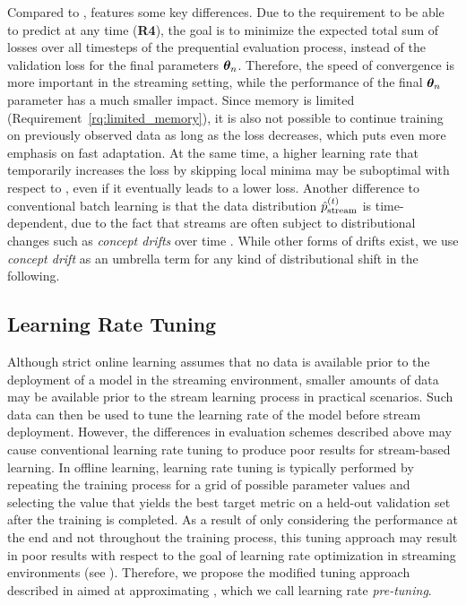 \documentclass{article} %
\begin{document}
Compared to ,  features some key differences.
Due to the requirement to be able to predict at any time (\textbf{R4}), the goal is to minimize the expected total sum of losses over all timesteps of the prequential evaluation process, instead of the validation loss for the final parameters ${\bm{\theta}}_n$.
Therefore, the speed of convergence is more important in the streaming setting, while the performance of the final ${\bm{\theta}}_n$ parameter has a much smaller impact.
Since memory is limited (Requirement~\ref{rq:limited_memory}), it is also not possible to continue training on previously observed data as long as the loss decreases, which puts even more emphasis on fast adaptation.
At the same time, a higher learning rate that temporarily increases the loss by skipping local minima may be suboptimal with respect to , even if it eventually leads to a lower loss.
Another difference to conventional batch learning is that the data distribution $\hat{p}_{\rm{stream}}^{(t)}$ is time-dependent, due to the fact that streams are often subject to distributional changes such as \textit{concept drifts} over time \citep{widmerLearningPresenceConcept1996}.
While other forms of drifts exist, we use \textit{concept drift} as an umbrella term for any kind of distributional shift in the following.

\subsection{Learning Rate Tuning}\label{subsec:pre-tuning}

Although strict online learning assumes that no data is available prior to the deployment of a model in the streaming environment, smaller amounts of data may be available prior to the stream learning process in practical scenarios.
Such data can then be used to tune the learning rate of the model before stream deployment.
However, the differences in evaluation schemes described above may cause conventional learning rate tuning to produce poor results for stream-based learning.
In offline learning, learning rate tuning is typically performed by repeating the training process for a grid of possible parameter values and selecting the value that yields the best target metric on a held-out validation set after the training is completed.
As a result of only considering the performance at the end and not throughout the training process, this tuning approach may result in poor results with respect to the goal of learning rate optimization in streaming environments (see ).
Therefore, we propose the modified tuning approach described in  aimed at approximating , which we call learning rate \textit{pre-tuning}.
\end{document}

